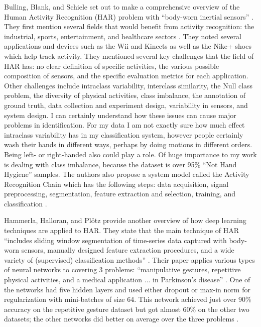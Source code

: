 \documentclass[]{report}
\begin{document}
Bulling, Blank, and Schiele set out to make a comprehensive overview of the Human Activity Recognition (HAR) problem with ``body-worn inertial sensors'' \cite{Bulling}. They first mention several fields that would benefit from activity recognition: the industrial, sports, entertainment, and healthcare sectors \cite{Bulling}. They noted several applications and devices such as the Wii and Kinects as well as the Nike+ shoes which help track activity. They mentioned several key challenges that the field of HAR has: no clear definition of specific activities, the various possible composition of sensors, and the specific evaluation metrics for each application. Other challenges include intraclass variability, interclass similarity, the Null class problem, the diversity of physical activities, class imbalance, the annotation of ground truth, data collection and experiment design, variability in sensors, and system design. I can certainly understand how these issues can cause major problems in identification. For my data I am not exactly sure how much effect intraclass variability has in my classification system, however people certainly wash their hands in different ways, perhaps by doing motions in different orders. Being left- or right-handed also could play a role. Of huge importance to my work is dealing with class imbalance, because the dataset is over 95\% ``Not Hand Hygiene'' samples. The authors also propose a system model called the Activity Recognition Chain which has the following steps: data acquisition, signal preprocessing, segmentation, feature extraction and selection, training, and classification \cite{Bulling}. 

Hammerla, Halloran, and Plötz provide another overview of how deep learning techniques are applied to HAR. They state that the main technique of HAR ``includes sliding window segmentation of time-series data captured with body-worn sensors, manually designed feature extraction procedures, and a wide variety of (supervised) classification methods'' \cite{Hammerla}. Their paper applies various types of neural networks to covering 3 problems: ``manipulative gestures, repetitive physical activities, and a medical application ... in Parkinson's disease'' \cite{Hammerla}. One of the networks had five hidden layers and used either dropout or max-in norm for regularization with mini-batches of size 64. This network achieved just over 90\% accuracy on the repetitive gesture dataset but got almost 60\% on the other two datasets; the other networks did better on average over the three problems \cite{Hammerla}.
\end{document}
